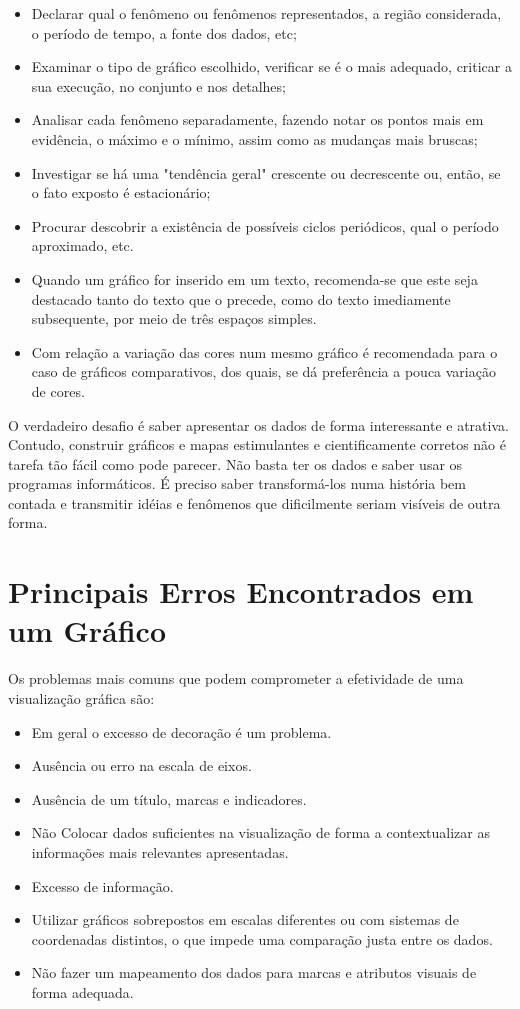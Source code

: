 \begin{itemize}
\item Declarar qual o fenômeno ou fenômenos representados, a região considerada, o período de tempo, a fonte dos dados, etc;
\item Examinar o tipo de gráfico escolhido, verificar se é o mais adequado, criticar a sua execução, no conjunto e nos detalhes;
\item Analisar cada fenômeno separadamente, fazendo notar os pontos mais em evidência, o máximo e o mínimo, assim como as mudanças mais bruscas; \item Investigar se há uma "tendência geral" crescente ou decrescente ou, então, se o fato exposto é estacionário; 
\item Procurar descobrir a existência de possíveis ciclos periódicos, qual o período aproximado, etc. 
\item Quando um gráfico for inserido em um texto, recomenda-se que este seja destacado tanto do texto que o precede, como do texto imediamente subsequente, por meio de três espaços simples. \item Com relação a variação das cores num mesmo gráfico é recomendada para o caso de gráficos comparativos, dos quais, se dá preferência a pouca variação de cores.
\end{itemize}

O verdadeiro desafio é saber apresentar os dados de forma interessante e atrativa. Contudo, construir gráficos e mapas estimulantes e cientificamente corretos não é tarefa tão fácil como pode parecer. Não basta ter os dados e saber usar os programas informáticos. É preciso saber transformá-los numa história bem contada e transmitir idéias e fenômenos que dificilmente seriam visíveis de outra forma.

\section{Principais Erros Encontrados em um Gráfico}

Os problemas mais comuns que podem comprometer a efetividade de uma visualização gráfica são:


\begin{itemize}
\item Em geral o excesso de decoração é um problema.
\item Ausência ou erro na escala de eixos.
\item Ausência de um título, marcas e indicadores.
\item Não Colocar dados suficientes na visualização de forma a contextualizar as informações mais relevantes apresentadas.
\item Excesso de informação.
\item  Utilizar gráficos sobrepostos em escalas diferentes ou com sistemas de coordenadas distintos, o que impede uma comparação justa entre os dados.
\item Não fazer um mapeamento dos dados para marcas e atributos visuais de forma adequada.
\end{itemize}


